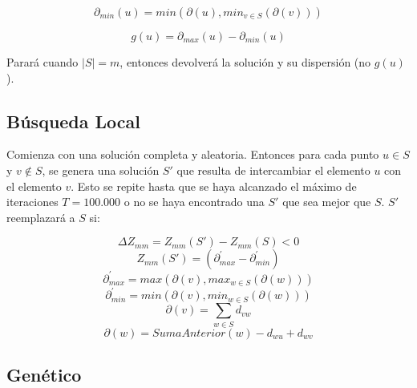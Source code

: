 \documentclass{article}
\begin{document}
    \begin{equation*}
        \partial_{min}(u) = min(\partial(u), min_{v \in S}(\partial(v)))
    \end{equation*}

    \begin{equation*}
        g(u) = \partial_{max}(u) - \partial_{min}(u)
    \end{equation*}

    Parará cuando $|S| = m$, entonces devolverá la solución y su dispersión (no $g(u)$).

    \subsection{Búsqueda Local}

    Comienza con una solución completa y aleatoria. Entonces para cada punto $u \in S$ y
    $v \notin S$, se genera una solución $S'$ que resulta de intercambiar el elemento $u$
    con el elemento $v$. Esto se repite hasta que se haya alcanzado el máximo de iteraciones
    $T = 100.000$ o no se haya encontrado una $S'$ que sea mejor que $S$.
    $S'$ reemplazará a $S$ si:

    \begin{equation*}
        \Delta Z_{mm} = Z_{mm}(S') - Z_{mm}(S) < 0
    \end{equation*}
    \begin{equation*}
        Z_{mm}(S') = (\partial_{max}^{'} - \partial_{min}^{'})
    \end{equation*}
    \begin{equation*}
        \partial_{max}^{'} = max(\partial(v), max_{w \in S}(\partial(w)))
    \end{equation*}
    \begin{equation*}
        \partial_{min}^{'} = min(\partial(v), min_{w \in S}(\partial(w)))
    \end{equation*}
    \begin{equation*}
        \partial(v) = \sum_{w \in S}d_{vw}
    \end{equation*}
    \begin{equation*}
        \partial(w) = SumaAnterior(w) - d_{wu} + d_{wv}
    \end{equation*}

    \pagebreak
    \subsection{Genético}
\end{document}
